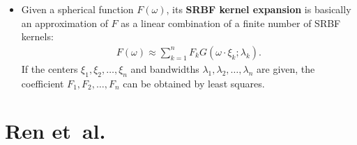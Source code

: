 \documentclass[10pt]{article}
\begin{document}
\begin{itemize}
    \item Given a spherical function $F(\omega)$, its \textbf{SRBF kernel expansion} is basically an approximation of $F$ as a linear combination of a finite number of SRBF kernels:
    \begin{align*}
      F(\omega) \approx \sum_{k=1}^n F_k G(\omega \cdot \xi_k; \lambda_k).
    \end{align*}
    If the centers $\xi_1, \xi_2, \dotsc, \xi_n$ and bandwidths $\lambda_1, \lambda_2, \dotsc, \lambda_n$ are given, the coefficient $F_1, F_2, \dotsc, F_n$ can be obtained by least squares. 
  
  \end{itemize}  

  \section{Ren et~al. \cite{Ren:2010}}
  
\end{document}
